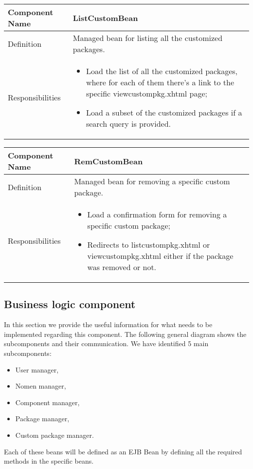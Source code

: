 \documentclass[a4paper,12pt]{book}
\begin{document}
            \begin{center}
              \begin{tabular}{ | p{3.3cm} | p{11.7cm} | }
                \hline
                Component Name & \textbf{ListCustomBean} \\ \hline
                Definition & Managed bean for listing all the customized packages. \\ \hline
                Responsibilities & \parbox{0.65\textwidth}{
                  \begin{itemize}[noitemsep,leftmargin=*]
                    \item Load the list of all the customized packages, where for each of them there's a link to the specific viewcustompkg.xhtml page;
                    \item Load a subset of the customized packages if a search query is provided.
                  \end{itemize}} \\ \hline
                \end{tabular}
              \end{center}
              \begin{center}
                \begin{tabular}{ | p{3.3cm} | p{11.7cm} | }
                  \hline
                  Component Name & \textbf{RemCustomBean} \\ \hline
                  Definition & Managed bean for removing a specific custom package. \\ \hline
                  Responsibilities & \parbox{0.65\textwidth}{
                    \begin{itemize}[noitemsep,leftmargin=*]
                      \item Load a confirmation form for removing a specific custom package;
                      \item Redirects to listcustompkg.xhtml or viewcustompkg.xhtml either if the package was removed or not.
                    \end{itemize}} \\ \hline
                  \end{tabular}
                \end{center}
  
\subsection{Business logic component}
In this section we provide the useful information for what needs to be implemented regarding this component. The following general diagram shows the subcomponents and their communication. We have identified 5 main subcomponents:
\begin{itemize}
  \item User manager,
  \item Nomen manager,
  \item Component manager,
  \item Package manager,
  \item Custom package manager.
\end{itemize}
Each of these beans will be defined as an EJB Bean by defining all the required methods in the specific beans.
\end{document}
